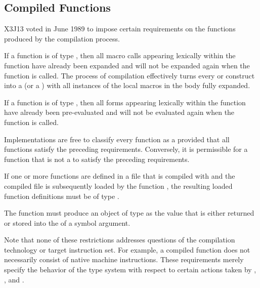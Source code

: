\begin{newer}
\subsection{Compiled Functions}

X3J13 voted in June 1989 
to impose certain requirements on the functions produced by the compilation
process.


If a function is of type , then
all macro calls appearing lexically within the function have 
        already been expanded and will not be expanded again when the
        function is called.  The process of
        compilation effectively turns every  or 
        construct into a  (or a ) with all
        instances of the local macros in the body fully expanded.

If a function is of type , then
all  forms appearing lexically within the function have
        already been pre-evaluated and will not be evaluated
        again when the function is called.
  
Implementations are free to classify every function as 
   a  provided that all functions
satisfy the preceding requirements.
Conversely, it is permissible for a function that is
      not a  to satisfy the preceding requirements.
  
If one or more functions are defined in a file that is compiled
      with  and the compiled file is subsequently loaded
by the function ,
the resulting loaded function definitions must be of
    type .
  
The function  must produce an object of type
       as the value that is either returned
or stored into the  of a symbol argument.

Note that none of these restrictions addresses questions of the compilation technology or
target instruction set.  For example, a compiled function does not necessarily consist of
native machine instructions.  These requirements merely specify the behavior of the type
system with respect to certain actions taken by , , and
.
\end{newer}

